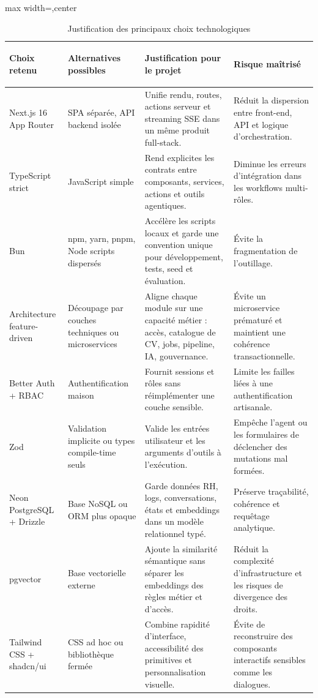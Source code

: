 \begin{table}[H]
  \centering
  \scriptsize
  \caption{\label{tab:tech-choice-justification}Justification des principaux choix technologiques}
  \begin{adjustbox}{max width=\linewidth,center}
  \begin{tabularx}{\textwidth}{>{\bfseries\raggedright\arraybackslash}p{2.5cm}>{\raggedright\arraybackslash}p{2.8cm}>{\raggedright\arraybackslash}X>{\raggedright\arraybackslash}X}
    \toprule
    Choix retenu & Alternatives possibles & Justification pour le projet & Risque maîtrisé \\
    \midrule
    Next.js 16 App Router & SPA séparée, API backend isolée & Unifie rendu, routes, actions serveur et streaming SSE dans un même produit full-stack. & Réduit la dispersion entre front-end, API et logique d'orchestration. \\
    TypeScript strict & JavaScript simple & Rend explicites les contrats entre composants, services, actions et outils agentiques. & Diminue les erreurs d'intégration dans les workflows multi-rôles. \\
    Bun & npm, yarn, pnpm, Node scripts dispersés & Accélère les scripts locaux et garde une convention unique pour développement, tests, seed et évaluation. & Évite la fragmentation de l'outillage. \\
    Architecture feature-driven & Découpage par couches techniques ou microservices & Aligne chaque module sur une capacité métier : accès, catalogue de CV, jobs, pipeline, IA, gouvernance. & Évite un microservice prématuré et maintient une cohérence transactionnelle. \\
    Better Auth + RBAC & Authentification maison & Fournit sessions et rôles sans réimplémenter une couche sensible. & Limite les failles liées à une authentification artisanale. \\
    Zod & Validation implicite ou types compile-time seuls & Valide les entrées utilisateur et les arguments d'outils à l'exécution. & Empêche l'agent ou les formulaires de déclencher des mutations mal formées. \\
    Neon PostgreSQL + Drizzle & Base NoSQL ou ORM plus opaque & Garde données RH, logs, conversations, états et embeddings dans un modèle relationnel typé. & Préserve traçabilité, cohérence et requêtage analytique. \\
    pgvector & Base vectorielle externe & Ajoute la similarité sémantique sans séparer les embeddings des règles métier et d'accès. & Réduit la complexité d'infrastructure et les risques de divergence des droits. \\
    Tailwind CSS + shadcn/ui & CSS ad hoc ou bibliothèque fermée & Combine rapidité d'interface, accessibilité des primitives et personnalisation visuelle. & Évite de reconstruire des composants interactifs sensibles comme les dialogues. \\
    \bottomrule
  \end{tabularx}
  \end{adjustbox}
\end{table}

